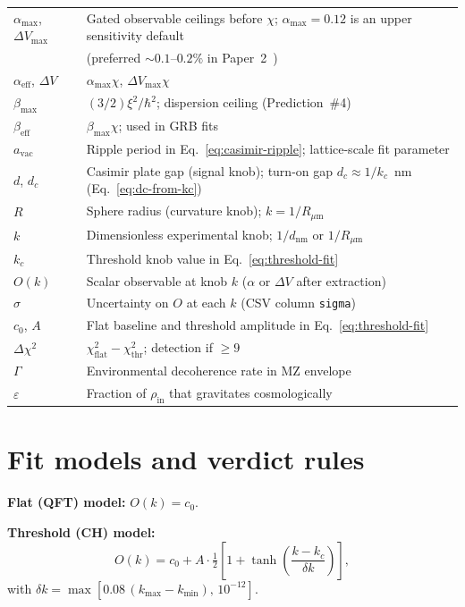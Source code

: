 \documentclass[11pt,a4paper]{article}
\begin{document}
\begin{table}[htbp]
\begin{tabularx}{\linewidth}{@{}l>{\raggedright\arraybackslash}X@{}}
    $\alpha_{\max}$, $\Delta V_{\max}$ & Gated observable ceilings before $\chi$; $\alpha_{\max}=0.12$ is an upper sensitivity default\\
    & (preferred $\sim 0.1$--$0.2\%$ in Paper~2~\cite{CHPaper2}) \\
    $\alpha_{\mathrm{eff}}$, $\Delta V$ & $\alpha_{\max}\chi$, $\Delta V_{\max}\chi$ \\
    $\beta_{\max}$ & $(3/2)\xi^2/\hbar^2$; dispersion ceiling (Prediction~\#4) \\
    $\beta_{\mathrm{eff}}$ & $\beta_{\max}\chi$; used in GRB fits \\
    $a_{\mathrm{vac}}$ & Ripple period in Eq.~\ref{eq:casimir-ripple}; lattice-scale fit parameter \\
    \midrule
    $d$, $d_c$ & Casimir plate gap (signal knob); turn-on gap $d_c \approx 1/k_c$~nm (Eq.~\ref{eq:dc-from-kc}) \\
    $R$ & Sphere radius (curvature knob); $k = 1/R_{\mu\mathrm{m}}$ \\
    $k$ & Dimensionless experimental knob; $1/d_{\mathrm{nm}}$ or $1/R_{\mu\mathrm{m}}$ \\
    $k_c$ & Threshold knob value in Eq.~\ref{eq:threshold-fit} \\
    $O(k)$ & Scalar observable at knob $k$ ($\alpha$ or $\Delta V$ after extraction) \\
    $\sigma$ & Uncertainty on $O$ at each $k$ (CSV column \texttt{sigma}) \\
    $c_0$, $A$ & Flat baseline and threshold amplitude in Eq.~\ref{eq:threshold-fit} \\
    $\Delta\chi^2$ & $\chi^2_{\mathrm{flat}} - \chi^2_{\mathrm{thr}}$; detection if $\geq 9$ \\
  \midrule
    $\Gamma$ & Environmental decoherence rate in MZ envelope \\
    $\varepsilon$ & Fraction of $\rho_{\mathrm{in}}$ that gravitates cosmologically \\
    \bottomrule
  \end{tabularx}
\end{table}

\section{Fit models and verdict rules}
\label{app:fits}

\textbf{Flat (QFT) model:} $O(k) = c_0$.

\textbf{Threshold (CH) model:}
\begin{equation}
  O(k) = c_0 + A \cdot \tfrac{1}{2}\left[1 + \tanh\!\left(\frac{k - k_c}{\delta k}\right)\right],
\end{equation}
with $\delta k = \max[0.08\,(k_{\max}-k_{\min}),\,10^{-12}]$.
\end{document}

